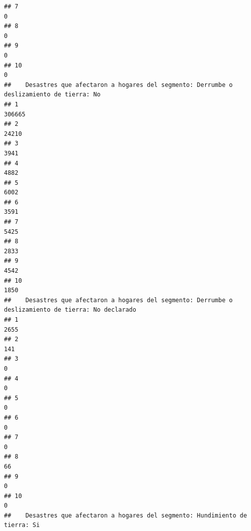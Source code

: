 \documentclass[11pt,]{article}
\begin{document}
\begin{verbatim}
## 7                                                                                       0
## 8                                                                                       0
## 9                                                                                       0
## 10                                                                                      0
##    Desastres que afectaron a hogares del segmento: Derrumbe o deslizamiento de tierra: No
## 1                                                                                  306665
## 2                                                                                   24210
## 3                                                                                    3941
## 4                                                                                    4882
## 5                                                                                    6002
## 6                                                                                    3591
## 7                                                                                    5425
## 8                                                                                    2833
## 9                                                                                    4542
## 10                                                                                   1850
##    Desastres que afectaron a hogares del segmento: Derrumbe o deslizamiento de tierra: No declarado
## 1                                                                                              2655
## 2                                                                                               141
## 3                                                                                                 0
## 4                                                                                                 0
## 5                                                                                                 0
## 6                                                                                                 0
## 7                                                                                                 0
## 8                                                                                                66
## 9                                                                                                 0
## 10                                                                                                0
##    Desastres que afectaron a hogares del segmento: Hundimiento de tierra: Si

\end{verbatim}
\end{document}
